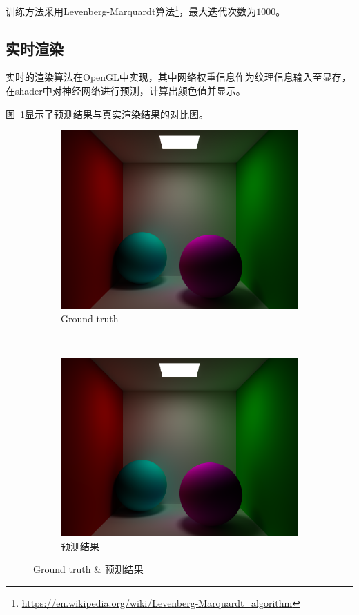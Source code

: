 训练方法采用Levenberg-Marquardt算法\footnote{\url{https://en.wikipedia.org/wiki/Levenberg-Marquardt_algorithm}}，最大迭代次数为$1000$。

\subsection {实时渲染}
实时的渲染算法在OpenGL中实现，其中网络权重信息作为纹理信息输入至显存，在shader中对神经网络进行预测，计算出颜色值并显示。

图~\ref{fig:prediction_groundtruth}显示了预测结果与真实渲染结果的对比图。
\begin{figure}[h]
    \centering
    \begin{subfigure}{0.4\textwidth}
        \includegraphics[width=\textwidth]{img/ground_truth.png}
        \caption{Ground truth}
    \end{subfigure}
    ~
    \begin{subfigure}{0.4\textwidth}
        \includegraphics[width=\textwidth]{img/prediction.png}
        \caption{预测结果}
    \end{subfigure}
    \caption{Ground truth \& 预测结果}
    \label{fig:prediction_groundtruth}
\end{figure}
